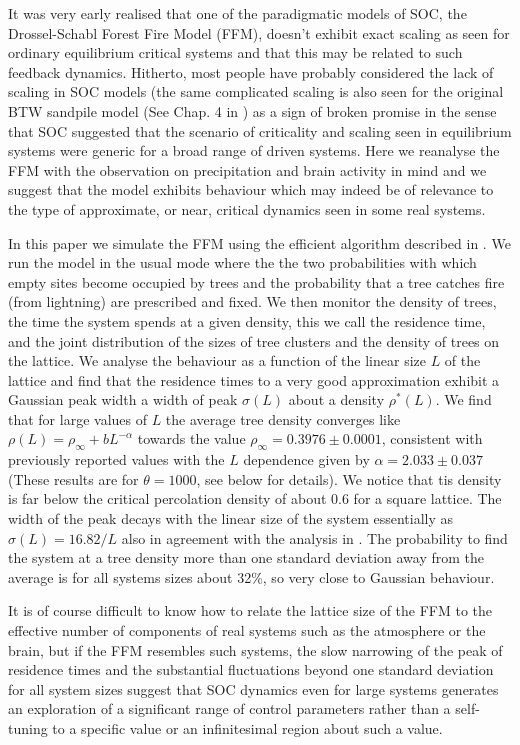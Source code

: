 \documentclass[aps,prl,showpacs,superscriptaddress,groupedaddress,notitlepage]{revtex4-1}
\begin{document}
 It was very early realised that one of the paradigmatic models of SOC, the Drossel-Schabl Forest Fire Model (FFM), doesn't exhibit exact scaling as seen for ordinary equilibrium critical systems\cite{Grassberger1993,Pruessner2002,Grassberger2002} and that this may be related to such feedback dynamics. Hitherto, most people have probably considered the lack of scaling in SOC models (the same complicated scaling is also seen for the original BTW sandpile model (See Chap. 4 in \cite{Gunnar_Book}) as a sign of broken promise in the sense that SOC suggested that the scenario of criticality and scaling seen in equilibrium systems were generic for a broad range of driven systems. Here we reanalyse the FFM with the observation on precipitation and brain activity in mind and we suggest that the  model exhibits behaviour which may indeed be of relevance to the type of approximate, or near, critical dynamics seen in some real systems.  
 
In this paper we simulate the FFM using the efficient algorithm described in \cite{Pruessner2002}. We run the model in the usual mode where the the two probabilities with which empty sites become occupied by trees and the probability that a tree catches fire (from lightning) are prescribed and fixed. We then monitor the density of trees, the time the system spends at a given density, this we call the residence time, and the joint distribution of the sizes of tree clusters and the density of trees on the lattice. We analyse the behaviour as a function of the linear size $L$ of the lattice  and find that the residence times to a very good approximation exhibit a Gaussian peak width a width of peak $\sigma(L)$  about a density $\rho^*(L)$.  We find that for large values of $L$ the average tree density converges like $\rho(L)=\rho_\infty+bL^{-\alpha} $ towards the value $\rho_\infty=0.3976\pm 0.0001$, consistent with previously reported values \cite{Pruessner2002} with the $L$ dependence given by $\alpha=2.033\pm0.037$ (These results are for $\theta=1000$, see below for details). We notice that tis density is far below the critical percolation density of about 0.6 for a square lattice. The width of the peak decays with the linear size of the system essentially as $\sigma(L)= 16.82/L$ also in agreement with the analysis in \cite{Pruessner2002}.  The probability to find the system at a tree density more than one standard deviation away from the average is for all systems sizes about 32\%, so very close to Gaussian behaviour.

It is of course difficult to know how to relate the lattice size of the FFM to the effective number of components of real systems such as the atmosphere or the brain, but if the FFM resembles such systems, the slow narrowing of the peak of residence times and the substantial fluctuations beyond one standard deviation for all system sizes  suggest that SOC dynamics even for large systems generates an exploration of a significant range of control parameters rather than a self-tuning to a specific value or an infinitesimal region about such a value.
\end{document}
